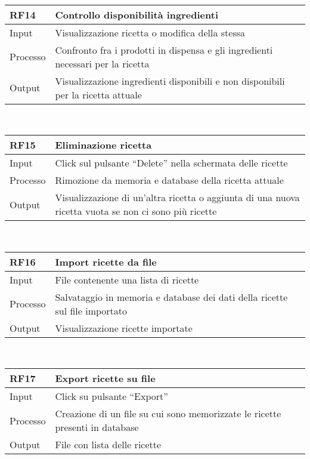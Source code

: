 \documentclass[
]{article}
\begin{document}
~

\begin{longtable}[]{@{}ll@{}}
\toprule\noalign{}
RF14 & Controllo disponibilità ingredienti \\
\midrule\noalign{}
\endhead
\bottomrule\noalign{}
\endlastfoot
Input & Visualizzazione ricetta o modifica della stessa \\
Processo & Confronto fra i prodotti in dispensa e gli ingredienti
necessari per la ricetta \\
Output & Visualizzazione ingredienti disponibili e non disponibili per
la ricetta attuale \\
\end{longtable}

~

\begin{longtable}[]{@{}ll@{}}
\toprule\noalign{}
RF15 & Eliminazione ricetta \\
\midrule\noalign{}
\endhead
\bottomrule\noalign{}
\endlastfoot
Input & Click sul pulsante ``Delete'' nella schermata delle ricette \\
Processo & Rimozione da memoria e database della ricetta attuale \\
Output & Visualizzazione di un'altra ricetta o aggiunta di una nuova
ricetta vuota se non ci sono più ricette \\
\end{longtable}

~

\begin{longtable}[]{@{}ll@{}}
\toprule\noalign{}
RF16 & Import ricette da file \\
\midrule\noalign{}
\endhead
\bottomrule\noalign{}
\endlastfoot
Input & File contenente una lista di ricette \\
Processo & Salvataggio in memoria e database dei dati della ricette sul
file importato \\
Output & Visualizzazione ricette importate \\
\end{longtable}

~

\begin{longtable}[]{@{}ll@{}}
\toprule\noalign{}
RF17 & Export ricette su file \\
\midrule\noalign{}
\endhead
\bottomrule\noalign{}
\endlastfoot
Input & Click su pulsante ``Export'' \\
Processo & Creazione di un file su cui sono memorizzate le ricette
presenti in database \\
Output & File con lista delle ricette \\
\end{longtable}
\end{document}
